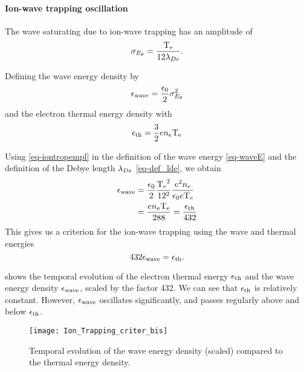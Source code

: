   
  \paragraph{Ion-wave trapping oscillation\\}
    The wave saturating due to ion-wave trapping has an amplitude of \citep{lafleur2017,boeuf2018}
     \begin{equation} \label{eq-iontropempl}
       \sigma_{E_{\theta}} = \frac{\mathrm{T_e}}{12 \lambda_{De}}.
     \end{equation}
    
    Defining the wave energy  density by
    \begin{equation} \label{eq-waveE}
      \epsilon_{\rm wave} = \frac{\epsilon_0}{2} \sigma_{E_{\theta}}^2
    \end{equation}
    and the electron thermal energy density with
    \begin{equation} \label{eq-thE}
      \epsilon_{\rm th} = \frac{3}{2} e n_e \mathrm{T_e}
    \end{equation}
    
    Using \cref{eq-iontropempl} in the definition of the wave energy \cref{eq-waveE} and the definition of the Debye length $\lambda_{De}$ \cref{eq-def_lde}, we obtain
    \begin{align*} \label{eq-step_1}
      \epsilon_{\rm wave} &=  \frac{\epsilon_0}{2} \frac{\mathrm{T_e}^2}{12^2} \frac{e^2 n_e}{ \epsilon_0 e\mathrm{T_e}}\\
      &= \frac{e n_e \mathrm{T_e} }{288} = \frac{\epsilon_{\rm th}}{432}
    \end{align*}
    This gives us a criterion for the ion-wave trapping using the wave and thermal energies
    \begin{equation} \label{eq-criteriaIT}
      432 \epsilon_{\rm wave} = \epsilon_{\rm th}.
    \end{equation}
    
     shows the temporal evolution of the electron thermal energy $\epsilon_{\rm th}$ and the wave energy density $\epsilon_{\rm wave}$, scaled by the factor 432.
    We can see that $\epsilon_{\rm th}$ is relatively constant.
    However, $\epsilon_{\rm wave}$  oscillates significantly, and passes regularly above and below $\epsilon_{\rm th}$.
    
    \begin{figure}[!hbt]
      \centering
      \texttt{[image: Ion\_Trapping\_criter\_bis]}
      \caption{Temporal evolution of the wave energy density (scaled) compared to the thermal energy density.}
      \label{fig-tempITcrit}
    \end{figure}
    
